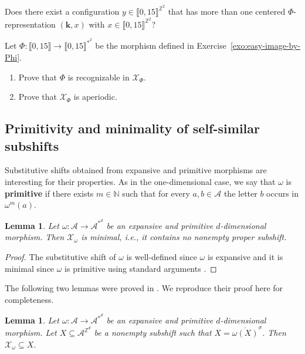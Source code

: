 \documentclass[12pt]{amsart}
\newtheorem{lemma}[definition]{Lemma}
\newcommand{\N}{\mathbb{N}}
\newcommand{\Z}{\mathbb{Z}}
\newcommand{\bk}{{\boldsymbol{k}}}
\newcommand{\Acal}{\mathcal{A}} %
\newcommand{\Xcal}{\mathcal{X}} %
\newcommand{\shiftclosure}[1]{{\overline{#1}^{\sigma}}}
\newcommand{\Zrange}[1]{\llbracket0,#1\rrbracket}
\newcommand{\ifnv}[2]{\ifthenelse{\equal{#1}{}}{}{#2}}
\newcommand\defn[2][]{\ifnv{#1}{\index{#1|\textbf}}{\index{#2|\textbf}}\textbf{#2}}
\begin{document}
\begin{exo}[label={exo:more-one-centered-representations}]
    Does there exist a configuration $y\in\Zrange{15}^{\Z^2}$ that
    has more than one centered $\Phi$-representation $(\bk,x)$ with
    $x\in\Zrange{15}^{\Z^2}$?
\end{exo}


\begin{exo}[label={exo:prove-recognizable-aperiodic}]
Let $\Phi:\Zrange{15}\to\Zrange{15}^{*^2}$
be the morphism defined in Exercise~\ref{exo:easy-image-by-Phi}.
    \begin{enumerate}%
        \item Prove that $\Phi$ is recognizable in $\Xcal_\Phi$.
        \item Prove that $\Xcal_\Phi$ is aperiodic.
    \end{enumerate}
\end{exo}



\subsection{Primitivity and minimality of self-similar subshifts}\label{sec:self-similar}


Substitutive shifts obtained from expansive and primitive morphisms are
interesting for their properties.
As in the one-dimensional case, we say that $\omega$ is \defn{primitive}
if there exists $m\in\N$ such that
for every $a,b\in\Acal$ the letter $b$ occurs in $\omega^m(a)$.

\begin{lemma}\label{lem:xcal_omega_minimal}
    Let $\omega:\Acal\to\Acal^{*^d}$ be an expansive and primitive $d$-dimensional
    morphism. Then $\Xcal_\omega$ is minimal, i.e., it contains no nonempty proper
    subshift.
\end{lemma}

\begin{proof}
    The substitutive shift of $\omega$ is well-defined since $\omega$ is expansive
    and it is minimal since $\omega$ is primitive 
    using standard arguments \cite[\S 5.2]{MR2590264}.
\end{proof}

The following two lemmas were proved in \cite{labbe_metallic_I_2024}.
We reproduce their proof here for completeness.

\begin{lemma}\label{lem:substitutive-contains-self-similar-part}
    {\rm\cite[Lemma~10.1]{labbe_metallic_I_2024}}
    Let $\omega:\Acal\to\Acal^{*^d}$ be an expansive and primitive $d$-dimensional
    morphism. Let $X\subseteq\Acal^{\Z^d}$ be a nonempty subshift 
    such that $X=\shiftclosure{\omega(X)}$. Then 
    $\Xcal_\omega\subseteq X$.
\end{lemma}
\end{document}
